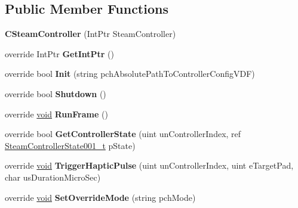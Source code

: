 \subsection*{Public Member Functions}
\begin{DoxyCompactItemize}
\item 
\hypertarget{classValve_1_1Steamworks_1_1CSteamController_acae582c1e8d270a60dddfea58c837dd6}{}{\bfseries C\+Steam\+Controller} (Int\+Ptr Steam\+Controller)\label{classValve_1_1Steamworks_1_1CSteamController_acae582c1e8d270a60dddfea58c837dd6}

\item 
\hypertarget{classValve_1_1Steamworks_1_1CSteamController_ab65a45d9f643a9b39699ac8b58e07b38}{}override Int\+Ptr {\bfseries Get\+Int\+Ptr} ()\label{classValve_1_1Steamworks_1_1CSteamController_ab65a45d9f643a9b39699ac8b58e07b38}

\item 
\hypertarget{classValve_1_1Steamworks_1_1CSteamController_ad1a24bdb36e2ea901bac36da330d4328}{}override bool {\bfseries Init} (string pch\+Absolute\+Path\+To\+Controller\+Config\+V\+D\+F)\label{classValve_1_1Steamworks_1_1CSteamController_ad1a24bdb36e2ea901bac36da330d4328}

\item 
\hypertarget{classValve_1_1Steamworks_1_1CSteamController_acc478dcfd916811c2e38420fbe66798d}{}override bool {\bfseries Shutdown} ()\label{classValve_1_1Steamworks_1_1CSteamController_acc478dcfd916811c2e38420fbe66798d}

\item 
\hypertarget{classValve_1_1Steamworks_1_1CSteamController_aca16dd5542abc5cdd752792a38d57428}{}override \hyperlink{SDL__audio_8h_a52835ae37c4bb905b903cbaf5d04b05f}{void} {\bfseries Run\+Frame} ()\label{classValve_1_1Steamworks_1_1CSteamController_aca16dd5542abc5cdd752792a38d57428}

\item 
\hypertarget{classValve_1_1Steamworks_1_1CSteamController_a72996843e1a5ff4fc761ab5ecf635519}{}override bool {\bfseries Get\+Controller\+State} (uint un\+Controller\+Index, ref \hyperlink{structValve_1_1Steamworks_1_1SteamControllerState001__t}{Steam\+Controller\+State001\+\_\+t} p\+State)\label{classValve_1_1Steamworks_1_1CSteamController_a72996843e1a5ff4fc761ab5ecf635519}

\item 
\hypertarget{classValve_1_1Steamworks_1_1CSteamController_a460da2204fb411817b00c1c5e070f461}{}override \hyperlink{SDL__audio_8h_a52835ae37c4bb905b903cbaf5d04b05f}{void} {\bfseries Trigger\+Haptic\+Pulse} (uint un\+Controller\+Index, uint e\+Target\+Pad, char us\+Duration\+Micro\+Sec)\label{classValve_1_1Steamworks_1_1CSteamController_a460da2204fb411817b00c1c5e070f461}

\item 
\hypertarget{classValve_1_1Steamworks_1_1CSteamController_abfea47d4a9d75fd9a6f6915c5a687444}{}override \hyperlink{SDL__audio_8h_a52835ae37c4bb905b903cbaf5d04b05f}{void} {\bfseries Set\+Override\+Mode} (string pch\+Mode)\label{classValve_1_1Steamworks_1_1CSteamController_abfea47d4a9d75fd9a6f6915c5a687444}

\end{DoxyCompactItemize}


